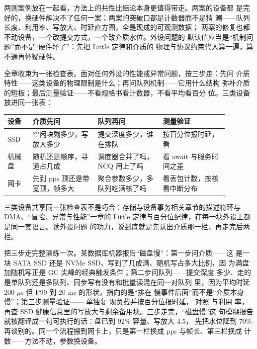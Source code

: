 两则案例放在一起看，方法上的共性比结论本身更值得带走。两案的设备都
是完好的，换硬件解决不了任何一案；两案的突破口都是计数器而不是猜
测——队列长度、利用率、写放大、时延直方图，全是现成的可观测数据；
两案的修复也都不动设备，一个改提交方式，一个改介质水位。外设问题的
默认值应当是“机制问题”而不是“硬件坏了”：先把 Little 定律和介质的
物理与协议约束代入算一遍，算不通再怀疑硬件。

全章收束为一张检查表。面对任何外设的性能或异常问题，按三步走：先问
介质特性——这类设备的物理限制是什么；再问队列机制——它用什么结构
弥补介质的短板；最后测量验证——不看规格书看计数器，不看平均看百分
位。三类设备放进同一张表：

\begin{longtable}{L{0.10\linewidth}L{0.26\linewidth}L{0.26\linewidth}L{0.26\linewidth}}
\toprule
设备 & 介质先问 & 队列再问 & 测量验证 \\
\midrule
SSD & 空闲块剩多少，写放大多少 & 提交深度多少，谁在排队 &  按百分位报时延， 看  \\\tablerowrule
机械盘 & 随机还是顺序，寻道占几成 & 调度器合并了吗，NCQ 用上了吗 &  看 await 与服务时间之差 \\\tablerowrule
网卡 & 先到 pps 顶还是带宽顶，帧多大 & 聚合参数多少，多队列吃满核了吗 &  看丢包计数，按核看中断分布 \\
\bottomrule
\end{longtable}

三类设备共享同一张检查表不是巧合：存储与设备事务相关章节的描述符环与 DMA、“冒险、异常与性能”一章的
Little 定律与百分位纪律，在每一块外设上都是同一套语言。读外设问题
的功力，说到底就是先认出介质那一栏，再走完后两栏。

把三步走完整演练一次。某数据库机器报告“磁盘慢”：第一步问介质——这
是一块 SATA SSD 还是 NVMe SSD、写到了几成满、随机写占多大比例，因
为满盘加随机写正是 GC 尖峰的经典触发条件；第二步问队列——提交深度
多少、走的是单队列还是多队列、同步写有没有和批量读混在同一对队列
里，因为平均时延 200 $\mu$s 但 P99 到 20 ms 的形状，指向的是“排在
慢事件后面”而不是“介质本身慢”；第三步测量验证—— 单独复
现负载并按百分位报时延， 对照  与利用
率，再查 SSD 健康信息里的写放大与剩余备用块。三步走完，“磁盘慢”这
句模糊报告就被翻译成一句可执行的话：盘已到 92\% 容量、写放大 4.5，
先把水位降到 70\% 再谈别的。同一个流程搬到网卡上，只是第一栏换成
pps 与帧长、第三栏换成  计数——方法不动，参数换设备。




























